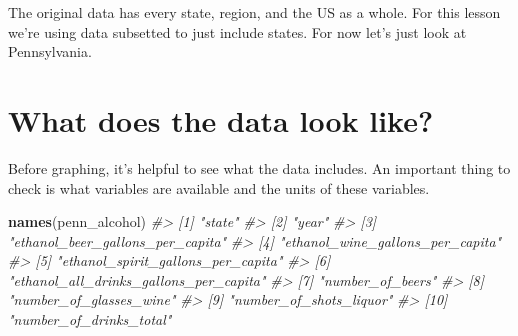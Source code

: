 \documentclass[
  12pt,
]{book}
\newenvironment{Shaded}{\begin{snugshade}}{\end{snugshade}}
\newcommand{\CommentTok}[1]{\textcolor[rgb]{0.56,0.35,0.01}{\textit{#1}}}
\newcommand{\KeywordTok}[1]{\textcolor[rgb]{0.13,0.29,0.53}{\textbf{#1}}}
\newcommand{\NormalTok}[1]{#1}
\newcommand{\OperatorTok}[1]{\textcolor[rgb]{0.81,0.36,0.00}{\textbf{#1}}}
\newcommand{\StringTok}[1]{\textcolor[rgb]{0.31,0.60,0.02}{#1}}
\begin{document}
The original data has every state, region, and the US as a whole. For this lesson we're using data subsetted to just include states. For now let's just look at Pennsylvania.

\begin{Shaded}
\end{Shaded}

\hypertarget{what-does-the-data-look-like}{%
\section{What does the data look like?}\label{what-does-the-data-look-like}}

Before graphing, it's helpful to see what the data includes. An important thing to check is what variables are available and the units of these variables.

\begin{Shaded}
\begin{Highlighting}[]
\KeywordTok{names}\NormalTok{(penn\_alcohol)}
\CommentTok{\#>  [1] "state"                                }
\CommentTok{\#>  [2] "year"                                 }
\CommentTok{\#>  [3] "ethanol\_beer\_gallons\_per\_capita"      }
\CommentTok{\#>  [4] "ethanol\_wine\_gallons\_per\_capita"      }
\CommentTok{\#>  [5] "ethanol\_spirit\_gallons\_per\_capita"    }
\CommentTok{\#>  [6] "ethanol\_all\_drinks\_gallons\_per\_capita"}
\CommentTok{\#>  [7] "number\_of\_beers"                      }
\CommentTok{\#>  [8] "number\_of\_glasses\_wine"               }
\CommentTok{\#>  [9] "number\_of\_shots\_liquor"               }
\CommentTok{\#> [10] "number\_of\_drinks\_total"}
\end{Highlighting}
\end{Shaded}
\end{document}
